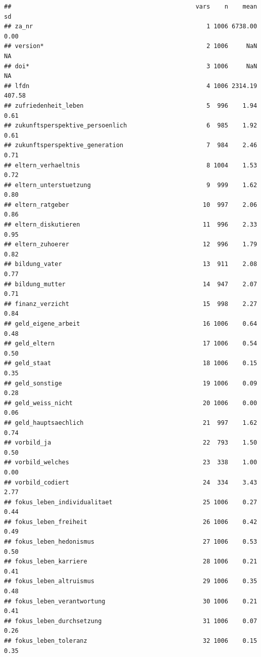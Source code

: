 \documentclass[
]{book}
\begin{document}
\begin{verbatim}
##                                                   vars    n    mean     sd
## za_nr                                                1 1006 6738.00   0.00
## version*                                             2 1006     NaN     NA
## doi*                                                 3 1006     NaN     NA
## lfdn                                                 4 1006 2314.19 407.58
## zufriedenheit_leben                                  5  996    1.94   0.61
## zukunftsperspektive_persoenlich                      6  985    1.92   0.61
## zukunftsperspektive_generation                       7  984    2.46   0.71
## eltern_verhaeltnis                                   8 1004    1.53   0.72
## eltern_unterstuetzung                                9  999    1.62   0.80
## eltern_ratgeber                                     10  997    2.06   0.86
## eltern_diskutieren                                  11  996    2.33   0.95
## eltern_zuhoerer                                     12  996    1.79   0.82
## bildung_vater                                       13  911    2.08   0.77
## bildung_mutter                                      14  947    2.07   0.71
## finanz_verzicht                                     15  998    2.27   0.84
## geld_eigene_arbeit                                  16 1006    0.64   0.48
## geld_eltern                                         17 1006    0.54   0.50
## geld_staat                                          18 1006    0.15   0.35
## geld_sonstige                                       19 1006    0.09   0.28
## geld_weiss_nicht                                    20 1006    0.00   0.06
## geld_hauptsaechlich                                 21  997    1.62   0.74
## vorbild_ja                                          22  793    1.50   0.50
## vorbild_welches                                     23  338    1.00   0.00
## vorbild_codiert                                     24  334    3.43   2.77
## fokus_leben_individualitaet                         25 1006    0.27   0.44
## fokus_leben_freiheit                                26 1006    0.42   0.49
## fokus_leben_hedonismus                              27 1006    0.53   0.50
## fokus_leben_karriere                                28 1006    0.21   0.41
## fokus_leben_altruismus                              29 1006    0.35   0.48
## fokus_leben_verantwortung                           30 1006    0.21   0.41
## fokus_leben_durchsetzung                            31 1006    0.07   0.26
## fokus_leben_toleranz                                32 1006    0.15   0.35

\end{verbatim}
\end{document}
